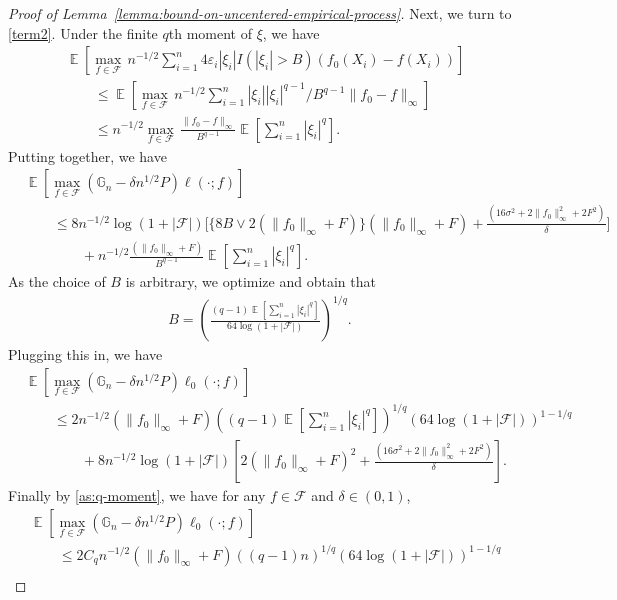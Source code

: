 \documentclass[12pt]{article}
\DeclareMathOperator*{\E}{\mathbb{E}}
\begin{document}
\begin{appendices}
\begin{proof}[Proof of Lemma~\ref{lemma:bound-on-uncentered-empirical-process}]
Next, we turn to \eqref{term2}. Under the finite $q$th moment of $\xi$, we have 
\begin{align*}
    &\E\left[\max_{f \in \mathcal{F}}\, n^{-1/2}\sum_{i=1}^n 4\varepsilon_i|\xi_i| I(|\xi_i|> B)(f_0(X_i) - f(X_i))\right]\\
    &\qquad \le \E\left[\max_{f \in \mathcal{F}}\,n^{-1/2}\sum_{i=1}^n |\xi_i| |\xi_i|^{q-1}/B^{q-1}\|f_0-f\|_\infty\right]\\
    & \qquad \le n^{-1/2}\max_{f \in \mathcal{F}}\,\frac{\|f_0-f\|_\infty}{B^{q-1}}\E\left[\sum_{i=1}^n |\xi_i|^{q}\right].
\end{align*}
Putting together, we have
\begin{align}
	&\E\left[\max_{f \in \mathcal{F}}\left(\mathbb{G}_n -\delta n^{1/2}P\right)\ell(\cdot; f)\right]\nonumber\\
&\qquad \le 8n^{-1/2}\log (1+|\mathcal{F}|)\bigg[\{8B \vee 2(\|f_0\|_\infty + F)\}(\|f_0\|_\infty+F) +\frac{(16\sigma^2+2\|f_0\|_\infty^2 + 2F^2)}{\delta}\bigg]\nonumber\\
&\qquad \qquad + n^{-1/2}\frac{(\|f_0\|_\infty+F)}{B^{q-1}}\E\left[\sum_{i=1}^n |\xi_i|^{q}\right].\nonumber
\end{align}
As the choice of $B$ is arbitrary, we optimize and obtain that 
\begin{align}
	B = \left(\frac{(q-1)\E\left[\sum_{i=1}^n |\xi_i|^{q}\right]}{64\log(1+|\mathcal{F}|)}\right)^{1/q}\nonumber.
\end{align}
Plugging this in, we have 
\begin{align}
	&\E\left[\max_{f \in \mathcal{F}}\left(\mathbb{G}_n -\delta n^{1/2}P\right)\ell_0(\cdot; f)\right]\nonumber\\
  &\qquad\le 2n^{-1/2}(\|f_0\|_\infty + F)\left((q-1)\E\left[\sum_{i=1}^n |\xi_i|^{q}\right]\right)^{1/q}\left(64\log (1+|\mathcal{F}|)\right)^{1-1/q}\nonumber \\
&\qquad \qquad+ 8n^{-1/2}\log (1+|\mathcal{F}|)\left[2(\|f_0\|_\infty + F)^2+\frac{(16\sigma^2+2\|f_0\|_\infty^2 + 2F^2)}{\delta}\right].\nonumber
\end{align}
Finally by \ref{as:q-moment}, we have for any $f\in\mathcal{F}$ and $\delta \in (0,1)$,
\begin{align}
	&\E\left[\max_{f \in \mathcal{F}}\left(\mathbb{G}_n -\delta n^{1/2}P\right)\ell_0(\cdot; f)\right]\nonumber\\
  &\qquad\le 2C_qn^{-1/2}(\|f_0\|_\infty + F)\left((q-1)n\right)^{1/q}\left(64\log (1+|\mathcal{F}|)\right)^{1-1/q}\nonumber \\

\end{align}
\end{proof}
\end{appendices}
\end{document}
